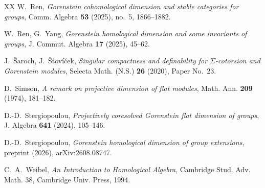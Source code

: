 \documentclass[12pt]{amsart}
\theoremstyle{remark}
\theoremstyle{definition}
\theoremstyle{plain}
\begin{document}
\begin{thebibliography}{XX}
 W.~Ren, \emph{Gorenstein cohomological dimension and stable categories for groups}, Comm. Algebra \textbf{53} (2025), no.~5, 1866--1882.

 W.~Ren, G.~Yang, \emph{Gorenstein homological dimension and some invariants of groups}, J. Commut. Algebra \textbf{17} (2025), 45--62.

 J.~\v{S}aroch, J.~\v{S}\v{t}ov\'i\v{c}ek, \emph{Singular compactness and definability for $\Sigma$-cotorsion and Gorenstein modules}, Selecta Math. (N.S.) \textbf{26} (2020), Paper No.~23.

 D.~Simson, \emph{A remark on projective dimension of flat modules}, Math. Ann. \textbf{209} (1974), 181--182.


 D.-D.~Stergiopoulou, \emph{Projectively coresolved Gorenstein flat dimension of groups}, J. Algebra \textbf{641} (2024), 105--146.

 D.-D.~Stergiopoulou, \emph{Gorenstein homological dimension of group extensions}, preprint (2026), arXiv:2608.08747.


 C.~A.~Weibel, \emph{An Introduction to Homological Algebra}, Cambridge Stud. Adv. Math. 38, Cambridge Univ. Press, 1994.

\end{thebibliography}
\end{document}
